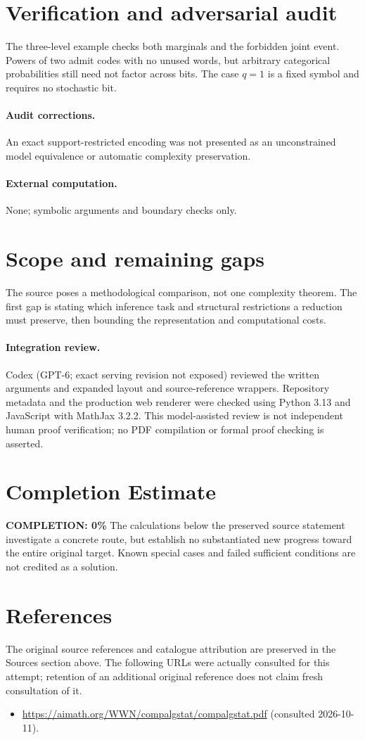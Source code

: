 \documentclass[11pt]{article}
\begin{document}
\section{Verification and adversarial audit}
The three-level example checks both marginals and the forbidden joint
event. Powers of two admit codes with no unused words, but arbitrary categorical
probabilities still need not factor across bits. The case $q=1$ is a fixed
symbol and requires no stochastic bit.
\paragraph{Audit corrections.} An exact support-restricted encoding was not presented as an unconstrained model equivalence or automatic complexity preservation.
\paragraph{External computation.} None; symbolic arguments and boundary checks only.
\section{Scope and remaining gaps}
The source poses a methodological comparison, not one complexity theorem.
The first gap is stating which inference task and structural restrictions a
reduction must preserve, then bounding the representation and computational costs.
\paragraph{Integration review.} Codex (GPT-6; exact serving revision not exposed) reviewed the written arguments and expanded layout and source-reference wrappers. Repository metadata and the production web renderer were checked using Python 3.13 and JavaScript with MathJax 3.2.2. This model-assisted review is not independent human proof verification; no PDF compilation or formal proof checking is asserted.

\section{Completion Estimate}
\noindent\textbf{COMPLETION: 0\%}
The calculations below the preserved source statement investigate a concrete route,
but establish no substantiated new progress toward the entire original target.
Known special cases and failed sufficient conditions are not credited as a solution.
\section{References}
The original source references and catalogue attribution are preserved in the
Sources section above. The following URLs were actually consulted for this attempt;
retention of an additional original reference does not claim fresh consultation of it.
\begin{itemize}
\item \url{https://aimath.org/WWN/compalgstat/compalgstat.pdf} (consulted 2026-10-11). 
\end{itemize}
\end{document}
